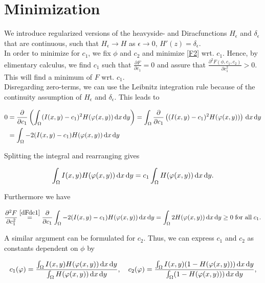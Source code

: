 \section{Minimization}
We introduce regularized versions of the heavyside- and Diracfunctions $H_\epsilon$ and $\delta_\epsilon$ that are continuous, such that $H_\epsilon\to H$ as $\epsilon\to 0$, $H'(z) = \delta_\epsilon$.\\
In order to minimize for $c_1$, we fix $\phi$ and $c_2$ and minimize \eqref{F2} wrt. $c_1$. Hence, by elimentary calculus, we find $c_1$ such that $\frac{\partial F}{\partial c_1}=0$ and assure that $\frac{\partial^2 F(\phi,c_1,c_2)}{\partial c_1^2} > 0$. This will find a minimum of $F$ wrt. $c_1$.\\
Disregarding zero-terms, we can use the Leibnitz integration rule because of the continuity assumption of $H_\epsilon$ and $\delta_\epsilon$. This leads to

\begin{align}
  0 &= \frac{\partial}{\partial c_1} \left(\int_\Omega (I(x,y)-c_1)^2H(\phi(x,y))\df x \df y\right)=\int_\Omega \frac{\partial}{\partial c_1} \left((I(x,y)-c_1)^2H(\phi(x,y))\right)\df x \df y\\
    &= \int_\Omega -2(I(x,y)-c_1)H(\phi(x,y))\df x \df y\label{dFdc1}
\end{align}

Splitting the integral and rearranging gives

\begin{align*} 
  \int_\Omega I(x,y)H(\varphi(x,y))\,{\rm d} x\,{\rm d} y = c_1\int_\Omega H(\varphi(x,y))\,{\rm d} x \,{\rm d} y.
\end{align*}

Furthermore we have 

\begin{equation}
\frac{\partial^2 F}{\partial c_1^2} \stackrel{\eqref{dFdc1}}{=} \frac{\partial}{\partial c_1} \int_\Omega -2(I(x,y)-c_1)H(\varphi(x,y))\,{\rm d} x \,{\rm d} y = \int_\Omega 2H(\varphi(x,y))\,{\rm d} x \,{\rm d} y \geq 0\; \text{for all} \; c_1.
\end{equation}

A similar argument can be formulated for $c_2$. Thus, we can express $c_1$ and $c_2$ as constants dependent on $\phi$ by

\begin{equation}
  c_1(\varphi) = \frac{\int_\Omega I(x,y) H(\varphi(x,y)) \,{\rm d} x \,{\rm d} y}{\int_\Omega H(\varphi(x,y)) \,{\rm d} x \,{\rm d} y}, \quad 
  c_2(\varphi) = \frac{\int_\Omega I(x,y) (1-H(\varphi(x,y))) \,{\rm d} x \,{\rm d} y}{\int_\Omega (1-H(\varphi(x,y))) \,{\rm d} x \,{\rm d} y},
\end{equation}

